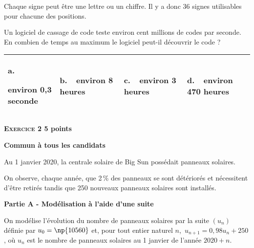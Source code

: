 \documentclass[11pt,a4paper]{article}
\begin{document}
Chaque signe peut être une lettre ou un chiffre. Il y a
donc 36 signes utilisables pour chacune des positions.

Un logiciel de cassage de code teste environ cent millions de codes par seconde. En combien de temps au maximum le logiciel peut-il découvrir le code ?

\begin{center}
\begin{tabularx}{\linewidth}{|*{4}{X|}}\hline
\textbf{a.~~}\raggedright environ 0,3 seconde&\textbf{b.~~}environ 8 heures&\textbf{c.~~}environ 3 heures&
\raggedright\textbf{d.~~}environ 470 heures\tabularnewline \hline
\end{tabularx}
\end{center}

\bigskip

\textbf{\textsc{Exercice 2} \hfill 5 points}

\textbf{Commun à tous les candidats}

\medskip

Au 1 janvier 2020, la centrale solaire de Big Sun possédait  panneaux solaires.

On observe, chaque année, que 2\,\% des panneaux se sont détériorés et nécessitent d'être retirés tandis que 250 nouveaux panneaux solaires sont installés.

\bigskip

\textbf{Partie A - Modélisation à l'aide d'une suite}

\medskip

On modélise l'évolution du nombre de panneaux solaires par la suite $\left(u_n\right)$ définie par $u_0 = \np{10560}$ et, pour tout entier naturel $n$,\, $u_{n+1} = 0,98u_n +250$, où $u_n$  est le nombre de panneaux solaires au 1 janvier de l'année $2020 +n$.

\medskip
\end{document}
